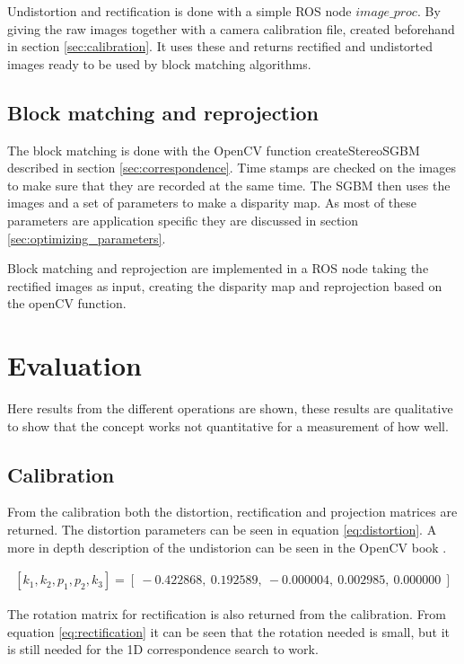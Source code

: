Undistortion and rectification is done with a simple ROS node $image\_proc$. By giving the raw images together with a camera calibration file, created beforehand in section \ref{sec:calibration}. It uses these and returns rectified and undistorted images ready to be used by block matching algorithms.

\subsection{Block matching and reprojection}

The block matching is done with the OpenCV function createStereoSGBM \cite{opencv} described in section \ref{sec:correspondence}. Time stamps are checked on the images to make sure that they are recorded at the same time. The SGBM then uses the images and a set of parameters to make a disparity map. As most of these parameters are application specific they are discussed in section \ref{sec:optimizing_parameters}. 

Block matching and reprojection are implemented in a ROS node taking the rectified images as input, creating the disparity map and reprojection based on the openCV function.
 
\section{Evaluation}
Here results from the different operations are shown, these results are qualitative to show that the concept works not quantitative for a measurement of how well.

\subsection{Calibration}
From the calibration both the distortion, rectification and projection matrices are returned. The distortion parameters can be seen in equation \ref{eq:distortion}. A more in depth description of the undistorion can be seen in the OpenCV book \cite{locv}.

\begin{equation}\label{eq:distortion}
\begin{split}
[ k_{1}, k_{2}, p_{1}, p_{2}, k_{3} ] = [\ -0.422868,\ 0.192589,\ -0.000004,\ 0.002985,\ 0.000000\ ]
\end{split}
\end{equation} 

The rotation matrix for rectification is also returned from the calibration. From equation \ref{eq:rectification} it can be seen that the rotation needed is small, but it is still needed for the 1D correspondence search to work. 

